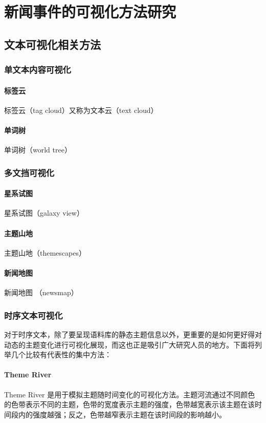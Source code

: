 \chapter{新闻事件的可视化方法研究}

\section{文本可视化相关方法}
\subsection{单文本内容可视化}
\subsubsection{标签云}
标签云（tag cloud）又称为文本云（text cloud）

\subsubsection{单词树}
单词树（world tree）

\subsection{多文挡可视化}
\subsubsection{星系试图}
星系试图（galaxy view）

\subsubsection{主题山地}
主题山地（themescapes）

\subsubsection{新闻地图}
新闻地图 （newsmap）

\subsection{时序文本可视化}
对于时序文本，除了要呈现语料库的静态主题信息以外，更重要的是如何更好得对动态的主题变化进行可视化展现，而这也正是吸引广大研究人员的地方。下面将列举几个比较有代表性的集中方法：
\subsubsection{Theme River}
Theme River \cite{Havre:2000}是用于模拟主题随时间变化的可视化方法。主题河流通过不同颜色的色带表示不同的主题，色带的宽度表示主题的强度，色带越宽表示该主题在该时间段内的强度越强；反之，色带越窄表示主题在该时间段的影响越小。


